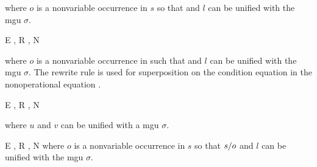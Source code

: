 \noindent
where $o$ is a nonvariable occurrence in $s$ so that  and $l$ 
can be unified with the mgu $\sigma$.\bigskip

\begin{CRule}
{E \cup {} , 
 R \cup {} , 
 N \cup {} }
\end{CRule}

where $o$ is a nonvariable occurrence in  such 
that  and $l$ can be unified
with the mgu $\sigma$. The rewrite rule  is 
used for superposition on the condition equation  
in the nonoperational equation . \bigskip

\begin{CRule}
        { E \cup {} , R ,
          N \cup {} }
\end{CRule}

\noindent
where $u$ and $v$ can be unified with a mgu $\sigma$.\bigskip

\begin{CRule}
{E \cup {} , 
 R \cup {} , 
 N \cup {}} 
where $o$ is a nonvariable occurrence in $s$ so that $\subterm{s}{o}$
and $l$ can be unified with the mgu $\sigma$.
\end{CRule}\bigskip


